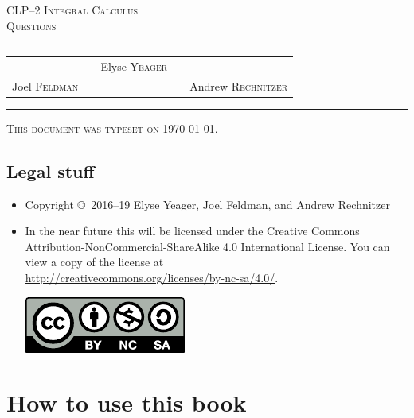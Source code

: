 \documentclass[12pt,letterpaper, openany]{book}
\begin{document}
\setcounter{page}{0}


\begin{titlepage}
\begin{center}
\textsc{\LARGE
CLP--2 Integral Calculus \\[2ex]
Questions
}\\[2ex]

\vspace{5ex}
\hrule
\vspace{5ex}

\begin{tabular}{lcccr}
&& \large Elyse \textsc{Yeager} \\[3ex]
 Joel \textsc{Feldman}
&\quad & &\quad&
Andrew \textsc{Rechnitzer}
\end{tabular}

\end{center}
\vspace{2ex}
\hrule

\vfill
\textsc{This document was typeset on \today.}
\end{titlepage}

\section*{Legal stuff}
\begin{itemize}
 \item Copyright \copyright\ 2016--19 Elyse Yeager,  Joel Feldman,
and Andrew  Rechnitzer

\item In the near future this will be licensed under the
Creative Commons Attribution-NonCommercial-ShareAlike 4.0 International
License. You can view a copy of the license at \\
\url{http://creativecommons.org/licenses/by-nc-sa/4.0/}.
\begin{center}
 \includegraphics{figures/by-nc-sa.pdf}
\end{center}
\end{itemize}

\newpage

\frontmatter

\chapter{How to use this book}

\end{document}
